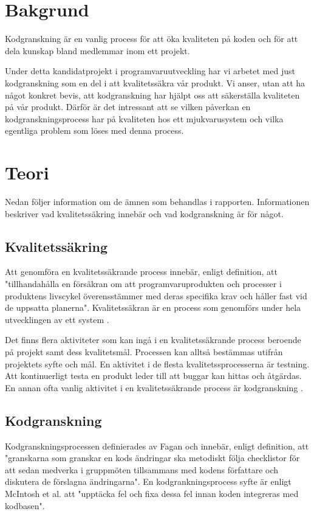 \section{Bakgrund}
\label{sec:background-wallstrom}

Kodgranskning är en vanlig process för att öka kvaliteten på koden och för att dela kunskap bland medlemmar inom ett projekt.

Under detta kandidatprojekt i programvaruutveckling har vi arbetet med just kodgranskning som en del i att kvalitetssäkra vår produkt. Vi anser, utan att ha något konkret bevis, att kodgranskning har hjälpt oss att säkerställa kvaliteten på vår produkt. Därför är det intressant att se vilken påverkan en kodgranskningsprocess har på kvaliteten hos ett mjukvarusystem och vilka egentliga problem som löses med denna process.

\section{Teori}
\label{sec:theory-wallstrom}
Nedan följer information om de ämnen som behandlas i rapporten. Informationen beskriver vad kvalitetssäkring innebär och vad kodgranskning är för något.

\subsection{Kvalitetssäkring}
Att genomföra en kvalitetssäkrande process innebär, enligt definition, att "tillhandahålla en försäkran om att programvaruprodukten och processer i produktens livscykel överensstämmer med deras specifika krav och håller fast vid de uppsatta planerna". 
Kvalitetssäkran är en process som genomförs under hela utvecklingen av ett system \cite{feldman2005quality}.

Det finns flera aktiviteter som kan ingå i en kvalitetssäkrande process beroende på projekt samt dess kvalitetsmål. Processen kan alltså bestämmas utifrån projektets syfte och mål. En aktivitet i de flesta kvalitetssprocesserna är testning. Att kontinuerligt testa en produkt leder till att buggar kan hittas och åtgärdas. En annan ofta vanlig aktivitet i en kvalitetssäkrande process är kodgranskning \cite{feldman2005quality}.

\subsection{Kodgranskning}
Kodgranskningsprocessen definierades av Fagan \cite{fagan1999design} och innebär, enligt definition, att "granskarna som granskar en kods ändringar ska metodiskt följa checklistor för att sedan medverka i gruppmöten tillsammans med kodens författare och diskutera de förslagna ändringarna". En kodgrankningsprocess syfte är enligt McIntosh et al. \cite{shimagaki2016study} att "upptäcka fel och fixa dessa fel innan koden integreras med kodbasen". 


